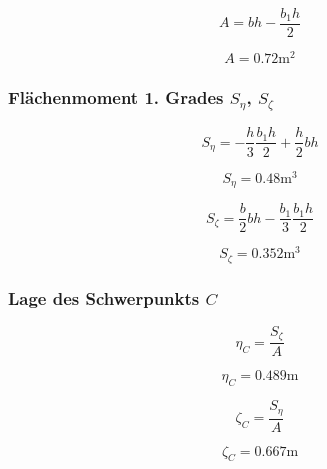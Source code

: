 \documentclass[
  12pt,
  letterpaper,
  DIV=11,
  egregdoesnotlikesansseriftitles]{scrartcl}
\begin{document}
\begin{equation}A = b h - \frac{b_{1} h}{2}\end{equation}

\begin{equation}A = 0.72 \text{m}^{2}\end{equation}

\hypertarget{fluxe4chenmoment-1.-grades-s_eta-s_zeta}{%
\subsubsection{\texorpdfstring{Flächenmoment 1. Grades \(S_\eta\),
\(S_\zeta\)}{Flächenmoment 1. Grades S\_\textbackslash eta, S\_\textbackslash zeta}}\label{fluxe4chenmoment-1.-grades-s_eta-s_zeta}}

\begin{equation}S_{\eta} = - \frac{h}{3} \frac{b_{1} h}{2} + \frac{h}{2} b h\end{equation}

\begin{equation}S_{\eta} = 0.48 \text{m}^{3}\end{equation}

\begin{equation}S_{\zeta} = \frac{b}{2} b h - \frac{b_{1}}{3} \frac{b_{1} h}{2}\end{equation}

\begin{equation}S_{\zeta} = 0.352 \text{m}^{3}\end{equation}

\hypertarget{lage-des-schwerpunkts-c}{%
\subsubsection{\texorpdfstring{Lage des Schwerpunkts
\(C\)}{Lage des Schwerpunkts C}}\label{lage-des-schwerpunkts-c}}

\begin{equation}\eta_{C} = \frac{S_{\zeta}}{A}\end{equation}

\begin{equation}\eta_{C} = 0.489 \text{m}\end{equation}

\begin{equation}\zeta_{C} = \frac{S_{\eta}}{A}\end{equation}

\begin{equation}\zeta_{C} = 0.667 \text{m}\end{equation}
\end{document}
